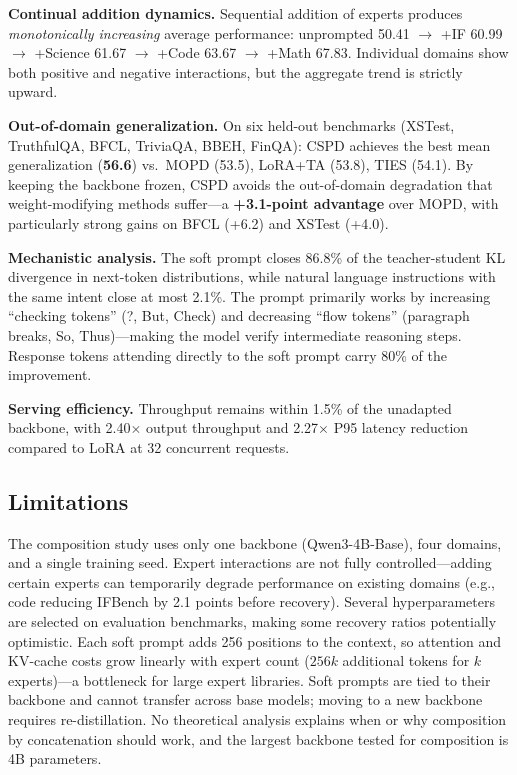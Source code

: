\documentclass[11pt,a4paper]{article}
\begin{document}
\textbf{Continual addition dynamics.} Sequential addition of experts produces \emph{monotonically increasing} average performance: unprompted 50.41 $\rightarrow$ +IF 60.99 $\rightarrow$ +Science 61.67 $\rightarrow$ +Code 63.67 $\rightarrow$ +Math 67.83. Individual domains show both positive and negative interactions, but the aggregate trend is strictly upward.

\textbf{Out-of-domain generalization.} On six held-out benchmarks (XSTest, TruthfulQA, BFCL, TriviaQA, BBEH, FinQA): CSPD achieves the best mean generalization (\textbf{56.6}) vs.\ MOPD (53.5), LoRA+TA (53.8), TIES (54.1). By keeping the backbone frozen, CSPD avoids the out-of-domain degradation that weight-modifying methods suffer---a \textbf{+3.1-point advantage} over MOPD, with particularly strong gains on BFCL (+6.2) and XSTest (+4.0).

\textbf{Mechanistic analysis.} The soft prompt closes 86.8\% of the teacher-student KL divergence in next-token distributions, while natural language instructions with the same intent close at most 2.1\%. The prompt primarily works by increasing ``checking tokens'' (?, But, Check) and decreasing ``flow tokens'' (paragraph breaks, So, Thus)---making the model verify intermediate reasoning steps. Response tokens attending directly to the soft prompt carry 80\% of the improvement.

\textbf{Serving efficiency.} Throughput remains within 1.5\% of the unadapted backbone, with 2.40$\times$ output throughput and 2.27$\times$ P95 latency reduction compared to LoRA at 32 concurrent requests.

\subsection{Limitations}
The composition study uses only one backbone (Qwen3-4B-Base), four domains, and a single training seed. Expert interactions are not fully controlled---adding certain experts can temporarily degrade performance on existing domains (e.g., code reducing IFBench by 2.1 points before recovery). Several hyperparameters are selected on evaluation benchmarks, making some recovery ratios potentially optimistic. Each soft prompt adds 256 positions to the context, so attention and KV-cache costs grow linearly with expert count ($256k$ additional tokens for $k$ experts)---a bottleneck for large expert libraries. Soft prompts are tied to their backbone and cannot transfer across base models; moving to a new backbone requires re-distillation. No theoretical analysis explains when or why composition by concatenation should work, and the largest backbone tested for composition is 4B parameters.
\end{document}
